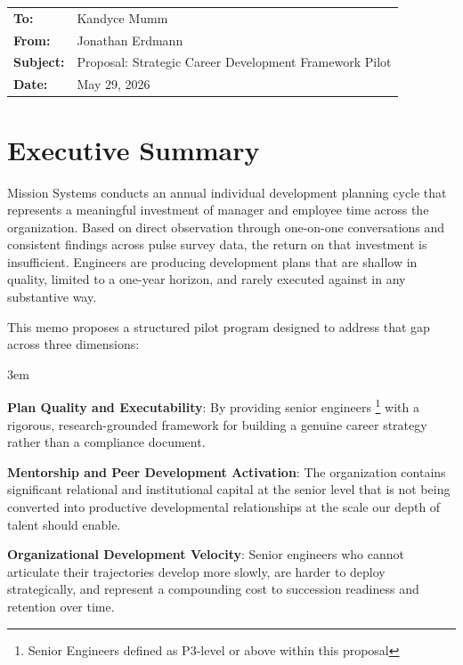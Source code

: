 \documentclass{article}
\begin{document}
\begin{tabular}{@{}ll}
\textbf{To:}      & Kandyce Mumm              \\[3pt]
\textbf{From:}    & Jonathan Erdmann          \\[3pt]
\textbf{Subject:} & Proposal: Strategic Career Development Framework Pilot \\[3pt]
\textbf{Date:}    & May 29, 2026                                           \\
\end{tabular}

\vspace{4pt}

\section{Executive Summary}

Mission Systems conducts an annual individual development planning cycle that
represents a meaningful investment of manager and employee time across the
organization. Based on direct observation through one-on-one conversations and
consistent findings across pulse survey data, the return on that investment is
insufficient. Engineers are producing development plans that are shallow in
quality, limited to a one-year horizon, and rarely executed against in any
substantive way.

This memo proposes a structured pilot program designed to address that gap
across three dimensions: 

\begin{addmargin}[2em]{3em}

\textbf{Plan Quality and Executability}: By providing senior 
	engineers \footnote{Senior Engineers defined as P3-level or above within this proposal}
	with a rigorous, research-grounded framework for
	building a genuine career strategy rather than a compliance document. 

\textbf{Mentorship and Peer Development Activation}: The organization contains
	significant relational and institutional capital at the senior level that is not
	being converted into productive developmental relationships at the scale our
	depth of talent should enable.

\textbf{Organizational Development Velocity}: Senior engineers who 
	cannot articulate their trajectories develop more
	slowly, are harder to deploy strategically, and represent a 
	compounding cost to succession readiness and retention over time. 

\end{addmargin}
\end{document}
